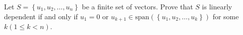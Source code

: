 Let $S = \left\{u_1,u_2,\dots,u_n\right\}$ be a finite set of
vectors. Prove that $S$ is linearly dependent if and only if $u_1 =0$
or $u_{k+1} \in
\text{span}\left(\left\{u_1,u_2,\dots,u_k\right\}\right)$ for some $k
\left(1 \leq k < n\right)$.
